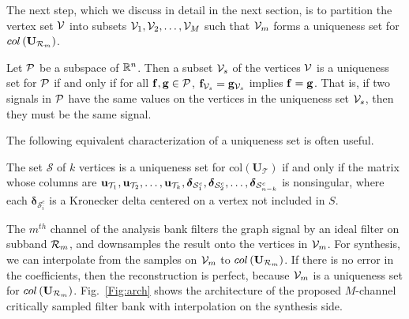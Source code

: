 \documentclass[journal, 10pt]{IEEEtran}
\begin{document}
The next step, which we discuss in detail in the next section, is to partition the vertex set ${\mathcal{V}}$ into subsets ${\mathcal{V}}_1,{\mathcal{V}}_2,\ldots,{\mathcal{V}}_M$ such that ${\mathcal{V}}_m$ forms a uniqueness set for $\mbox{col}\left(\mathbf{U}_{{\cal R}_m}\right)$.
\begin{definition}[Uniqueness set \cite{pesenson_paley}] 
Let ${\cal P}$ be a subspace of $\mathbb{R}^n$. 
Then a subset ${\mathcal{V}}_s$ of the vertices ${\mathcal{V}}$ is a uniqueness set for 
${\cal P}$ if  and only if for all %
${\bf f},{\bf g} \in {\cal P}$,
${\bf f}_{{\mathcal{V}}_s}={\bf g}_{{\mathcal{V}}_s}$ implies ${\bf f}={\bf g}$. That is, if two signals in ${\cal P}$ have the same values on the vertices in the uniqueness set ${\mathcal{V}}_s$, then they must be the same signal.
\end{definition}
The following equivalent characterization of a uniqueness set is often useful.
\begin{lemma}\label{Le:eq_uniq}
The set $\mathcal{S}$ of $k$ vertices is a uniqueness set for $\mbox{col}({\mathbf{U}}_{\mathcal T})$ if and only if the matrix whose columns are ${\bf u}_{{\mathcal T}_1},{\bf u}_{{\mathcal T}_2},\ldots,{\bf u}_{{\mathcal T}_k}, {\boldsymbol \delta}_{{\mathcal{S}}^c_1}, {\boldsymbol \delta}_{{\mathcal{S}}^c_2}, \ldots, {\boldsymbol \delta}_{{\mathcal{S}}^c_{n-k}}$ is nonsingular,
where each ${\boldsymbol \delta}_{{\mathcal{S}}^c_i}$ is a Kronecker delta centered on a vertex not included in $S$. 
\end{lemma}
The $m^{th}$ channel of the analysis %
bank %
filters the graph signal by an ideal %
filter on subband ${\cal R}_m$, and downsamples the result onto the vertices in ${\mathcal{V}}_m$. For synthesis, we can interpolate from the samples on ${\mathcal{V}}_m$ to $\mbox{col}\left(\mathbf{U}_{{\cal R}_m}\right)$. If there is no error in the coefficients, then the reconstruction is perfect, because ${\mathcal{V}}_m$ is a uniqueness set for $\mbox{col}\left(\mathbf{U}_{{\cal R}_m}\right)$. Fig.\ \ref{Fig:arch} shows the architecture of the proposed $M$-channel critically sampled filter bank with interpolation on the synthesis side.
\end{document}
